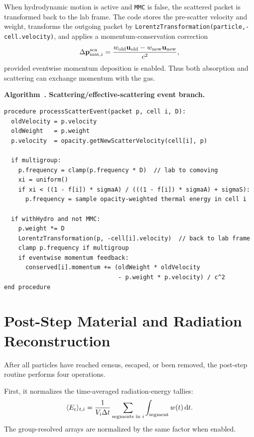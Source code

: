 \documentclass[11pt]{article}
\newcounter{algorithm}
\newcommand{\AlgorithmCaption}[2]{%
  \refstepcounter{algorithm}%
  \label{#1}%
  \par\medskip\noindent\textbf{Algorithm~\thealgorithm. #2}\par\nobreak\smallskip%
}
\newcommand{\dt}{\Delta t}
\newcommand{\dd}{\mathrm{d}}
\newcommand{\mom}{\mathbf{p}}
\begin{document}
When hydrodynamic motion is active and \texttt{MMC} is false, the scattered
packet is transformed back to the lab frame. The code stores the pre-scatter
velocity and weight, transforms the outgoing packet by
\texttt{LorentzTransformation(particle,-cell.velocity)}, and applies a
momentum-conservation correction
\begin{equation}
  \Delta \mom_{{\rm mat},i}^{\rm sca}
  =
  \frac{w_{\rm old}\mathbf{u}_{\rm old}
        - w_{\rm new}\mathbf{u}_{\rm new}}{c^2},
  \label{eq:scatter-momentum}
\end{equation}
provided eventwise momentum deposition is enabled. Thus both absorption and
scattering can exchange momentum with the gas.

\AlgorithmCaption{alg:scatter}{Scattering/effective-scattering event branch.}
\begin{verbatim}
procedure processScatterEvent(packet p, cell i, D):
  oldVelocity = p.velocity
  oldWeight   = p.weight
  p.velocity  = opacity.getNewScatterVelocity(cell[i], p)

  if multigroup:
    p.frequency = clamp(p.frequency * D)  // lab to comoving
    xi = uniform()
    if xi < ((1 - f[i]) * sigmaA) / (((1 - f[i]) * sigmaA) + sigmaS):
      p.frequency = sample opacity-weighted thermal energy in cell i

  if withHydro and not MMC:
    p.weight *= D
    LorentzTransformation(p, -cell[i].velocity)  // back to lab frame
    clamp p.frequency if multigroup
    if eventwise momentum feedback:
      conserved[i].momentum += (oldWeight * oldVelocity
                                - p.weight * p.velocity) / c^2
end procedure
\end{verbatim}

\section{Post-Step Material and Radiation Reconstruction}

After all particles have reached census, escaped, or been removed, the
post-step routine performs four operations.

First, it normalizes the time-averaged radiation-energy tallies:
\begin{equation}
  \langle E_{\rm r}\rangle_{t,i}
  =
  \frac{1}{V_i\dt}
  \sum_{\hbox{\scriptsize segments in }i}
  \int_{\hbox{\scriptsize segment}} w(t)\,\dd t .
\end{equation}
The group-resolved arrays are normalized by the same factor when enabled.
\end{document}
